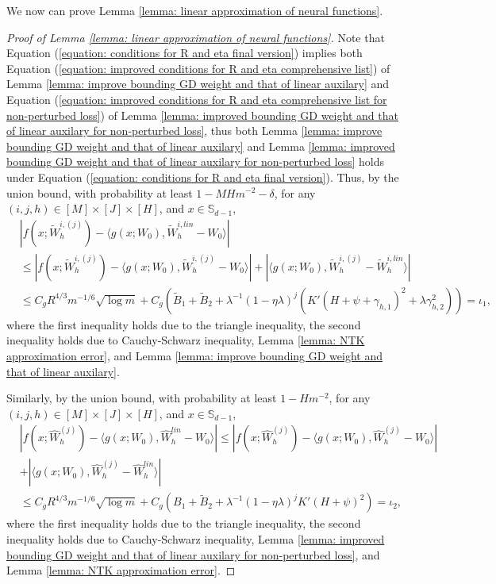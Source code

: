 \documentclass{article} \usepackage{iclr2023/iclr2023_conference,times}
\begin{document}
We now can prove Lemma \ref{lemma: linear approximation of neural functions}.
\begin{proof}[Proof of Lemma \ref{lemma: linear approximation of neural functions}]
Note that Equation (\ref{equation: conditions for R and eta final version}) implies both Equation (\ref{equation: improved conditions for R and eta comprehensive list}) of Lemma \ref{lemma: improve bounding GD weight and that of linear auxilary} and Equation (\ref{equation: improved conditions for R and eta comprehensive list for non-perturbed loss}) of Lemma \ref{lemma: improved bounding GD weight and that of linear auxilary for non-perturbed loss}, thus both  Lemma \ref{lemma: improve bounding GD weight and that of linear auxilary} and Lemma \ref{lemma: improved bounding GD weight and that of linear auxilary for non-perturbed loss} holds under Equation (\ref{equation: conditions for R and eta final version}). Thus, by the union bound, with probability at least $1 -  M H m^{-2} - \delta$, for any $(i,j,h)  \in [M] \times [J] \times [H]$, and $x \in \mathbb{S}_{d-1}$,
\begin{align*}
    &|f(x; \tilde{W}^{i,(j)}_h) - \langle g(x; W_0), \tilde{W}_h^{i,lin} - W_0 \rangle| \\
    &\leq |f(x; \tilde{W}^{i,(j)}_h) - \langle g(x; W_0), \tilde{W}_h^{i, (j)} - W_0 \rangle| + |\langle g(x; W_0), \tilde{W}^{i,(j)}_h - \tilde{W}_h^{i,lin} \rangle| \\ 
    &\leq C_g R^{4/3} m^{-1/6} \sqrt{ \log m} + C_g \left( \tilde{B}_1 + \tilde{B}_2 + \lambda^{-1}(1 - \eta \lambda)^j \left( K'(H + \psi + \gamma_{h,1} )^2 + \lambda \gamma_{h,2}^2\right) \right)  = \iota_1, 
\end{align*}
where the first inequality holds due to the triangle inequality, the second inequality holds due to Cauchy-Schwarz inequality, Lemma \ref{lemma: NTK approximation error}, and Lemma \ref{lemma: improve bounding GD weight and that of linear auxilary}. 

Similarly, by the union bound, with probability at least $1 -  H m^{-2}$, for any $(i,j,h)  \in [M] \times [J] \times [H]$, and $x \in \mathbb{S}_{d-1}$,
\begin{align*}
    &|f(x; \hat{W}^{(j)}_h) - \langle g(x; W_0), \hat{W}_h^{lin} - W_0 \rangle| \leq |f(x; \hat{W}^{(j)}_h) - \langle g(x; W_0), \hat{W}_h^{(j)} - W_0 \rangle| \\
    &+ |\langle g(x; W_0), \hat{W}^{(j)}_h - \hat{W}_h^{lin} \rangle| \\ 
    &\leq C_g R^{4/3} m^{-1/6} \sqrt{ \log m} + C_g \left( B_1 + \tilde{B}_2 + \lambda^{-1}(1 - \eta \lambda)^j  K'(H + \psi  )^2 \right)  = \iota_2, 
\end{align*}
where the first inequality holds due to the triangle inequality, the second inequality holds due to Cauchy-Schwarz inequality, Lemma \ref{lemma: improved bounding GD weight and that of linear auxilary for non-perturbed loss}, and Lemma \ref{lemma: NTK approximation error}. 
\end{proof}
\end{document}
